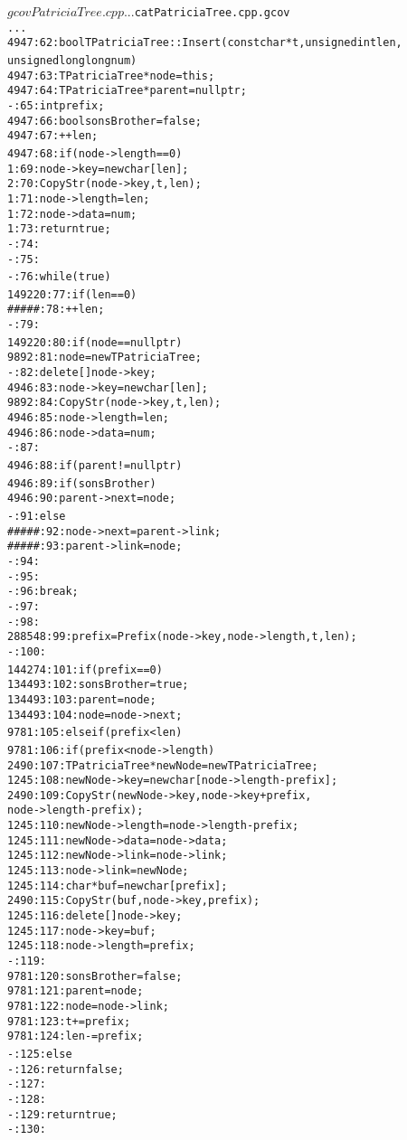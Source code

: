\documentclass[pdf, unicode, 12pt, a4paper,oneside,fleqn]{article}
\begin{document}
\begin{alltt}
$ gcov PatriciaTree.cpp
...
$ cat PatriciaTree.cpp.gcov
...
     4947:   62:bool TPatriciaTree::Insert(const char *t, unsigned int len,
      unsigned long long num) {
     4947:   63:    TPatriciaTree *node = this;
     4947:   64:    TPatriciaTree *parent = nullptr;
        -:   65:    int prefix;
     4947:   66:    bool sonsBrother = false;
     4947:   67:    ++len;
     4947:   68:    if (node->length == 0) {
        1:   69:        node->key = new char[len];
        2:   70:        CopyStr(node->key, t, len);
        1:   71:        node->length = len;
        1:   72:        node->data = num;
        1:   73:        return true;
        -:   74:    }
        -:   75:
        -:   76:    while (true) {
   149220:   77:        if (len == 0) {
    #####:   78:            ++len;
        -:   79:        }
   149220:   80:        if (node == nullptr) {
     9892:   81:            node = new TPatriciaTree;
        -:   82:            delete []  node->key;
     4946:   83:            node->key = new char[len];
     9892:   84:            CopyStr(node->key, t, len);
     4946:   85:            node->length = len;
     4946:   86:            node->data = num;
        -:   87:
     4946:   88:            if (parent != nullptr) {
     4946:   89:                if (sonsBrother) {
     4946:   90:                    parent->next = node;
        -:   91:                } else {
    #####:   92:                    node->next = parent->link;
    #####:   93:                    parent->link = node;
        -:   94:                }
                -:   95:            }
        -:   96:            break;
        -:   97:        }
        -:   98:
   288548:   99:        prefix = Prefix(node->key, node->length, t, len);
        -:  100:
   144274:  101:        if (prefix == 0) {
   134493:  102:            sonsBrother = true;
   134493:  103:            parent = node;
   134493:  104:            node = node->next;
     9781:  105:        } else if (prefix < len) {
     9781:  106:            if (prefix < node->length) {
     2490:  107:                TPatriciaTree *newNode = new TPatriciaTree;
     1245:  108:                newNode->key = new char[node->length - prefix];
     2490:  109:                CopyStr(newNode->key, node->key + prefix,
      node->length - prefix);
     1245:  110:                newNode->length = node->length - prefix;
     1245:  111:                newNode->data = node->data;
     1245:  112:                newNode->link = node->link;
     1245:  113:                node->link = newNode;
     1245:  114:                char *buf = new char[prefix];
     2490:  115:                CopyStr(buf, node->key, prefix);
     1245:  116:                delete[] node->key;
     1245:  117:                node->key = buf;
     1245:  118:                node->length = prefix;
        -:  119:            }
     9781:  120:            sonsBrother = false;
     9781:  121:            parent = node;
     9781:  122:            node = node->link;
     9781:  123:            t += prefix;
     9781:  124:            len -= prefix;
        -:  125:        } else {
        -:  126:            return false;
        -:  127:        }
        -:  128:    }
        -:  129:    return true;
        -:  130:}
\end{alltt}
\end{document}
